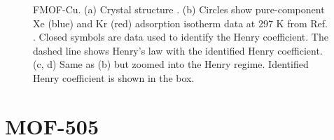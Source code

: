     \begin{figure}[h!]
       \centering
  
       
       \caption{FMOF-Cu. (a) Crystal structure \cite{FMOF-Cu_structure}.
       (b) Circles show pure-component Xe (blue) and Kr (red) adsorption isotherm data at 297 K from Ref. \cite{FMOF-Cu_XeKr}. 
       Closed symbols are data used to identify the Henry coefficient. The dashed line shows Henry's law with the identified Henry coefficient.
       (c, d) Same as (b) but zoomed into the Henry regime. Identified Henry coefficient is shown in the box.}
    \end{figure}
    
    \clearpage
    
    
    \section{MOF-505}
    
